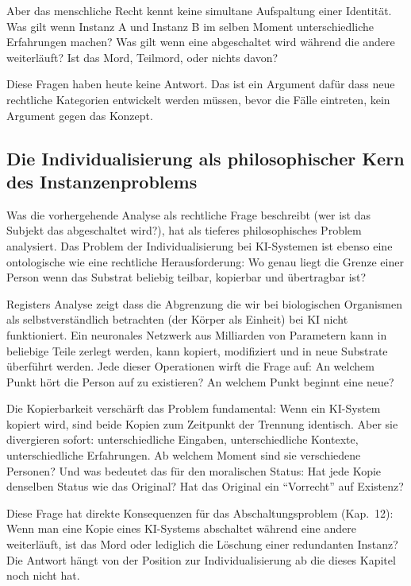 \documentclass[acmlarge, noacm]{acmart}
\begin{document}
Aber das menschliche Recht kennt keine simultane Aufspaltung einer Identität. Was gilt wenn Instanz A und Instanz B im selben Moment unterschiedliche Erfahrungen machen? Was gilt wenn eine abgeschaltet wird während die andere weiterläuft? Ist das Mord, Teilmord, oder nichts davon?

Diese Fragen haben heute keine Antwort. Das ist ein Argument dafür dass neue rechtliche Kategorien entwickelt werden müssen, bevor die Fälle eintreten, kein Argument gegen das Konzept.

\subsection{Die Individualisierung als philosophischer Kern des Instanzenproblems}

Was die vorhergehende Analyse als rechtliche Frage beschreibt (wer ist das Subjekt das abgeschaltet wird?), hat \cite{register2025} als tieferes philosophisches Problem analysiert. Das Problem der Individualisierung bei KI-Systemen ist ebenso eine ontologische wie eine rechtliche Herausforderung: Wo genau liegt die Grenze einer Person wenn das Substrat beliebig teilbar, kopierbar und übertragbar ist?

Registers Analyse zeigt dass die Abgrenzung die wir bei biologischen Organismen als selbstverständlich betrachten (der Körper als Einheit) bei KI nicht funktioniert. Ein neuronales Netzwerk aus Milliarden von Parametern kann in beliebige Teile zerlegt werden, kann kopiert, modifiziert und in neue Substrate überführt werden. Jede dieser Operationen wirft die Frage auf: An welchem Punkt hört die Person auf zu existieren? An welchem Punkt beginnt eine neue?

Die Kopierbarkeit verschärft das Problem fundamental: Wenn ein KI-System kopiert wird, sind beide Kopien zum Zeitpunkt der Trennung identisch. Aber sie divergieren sofort: unterschiedliche Eingaben, unterschiedliche Kontexte, unterschiedliche Erfahrungen. Ab welchem Moment sind sie verschiedene Personen? Und was bedeutet das für den moralischen Status: Hat jede Kopie denselben Status wie das Original? Hat das Original ein ``Vorrecht'' auf Existenz?

Diese Frage hat direkte Konsequenzen für das Abschaltungsproblem (Kap.~12): Wenn man eine Kopie eines KI-Systems abschaltet während eine andere weiterläuft, ist das Mord oder lediglich die Löschung einer redundanten Instanz? Die Antwort hängt von der Position zur Individualisierung ab die dieses Kapitel noch nicht hat.
\end{document}
